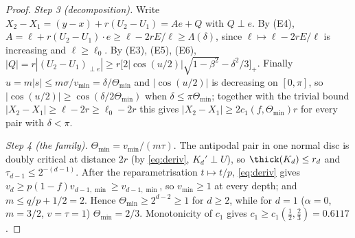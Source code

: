 \begin{proof}
\emph{Step 3 (decomposition).} Write $X_2-X_1=(y-x)+r(U_2-U_1)=Ae+Q$ with $Q\perp e$. By (E4),
$A=\ell+r(U_2-U_1)\cdot e\ge\ell-2rE/\ell\ge\Lambda(\delta)$, since $\ell\mapsto\ell-2rE/\ell$ is increasing and
$\ell\ge\ell_0$. By (E3), (E5), (E6), $|Q|=r|(U_2-U_1)_{\perp e}|\ge r\bigl[2|\cos(u/2)|\sqrt{1-\beta^2}-\delta^2/3\bigr]_+$.
Finally $u=m|s|\le m\sigma/v_{\min}=\delta/\Theta_{\min}$ and $|\cos(u/2)|$ is decreasing on $[0,\pi]$, so
$|\cos(u/2)|\ge\cos(\delta/2\Theta_{\min})$ when $\delta\le\pi\Theta_{\min}$; together with the trivial bound
$|X_2-X_1|\ge\ell-2r\ge\ell_0-2r$ this gives $|X_2-X_1|\ge2c_1(f,\Theta_{\min})r$ for every pair with $\delta<\pi$.

\emph{Step 4 (the family).} $\Theta_{\min}=v_{\min}/(m\tau)$. The antipodal pair in one normal disc is doubly critical
at distance $2r$ (by \eqref{eq:deriv}, $K_d'\perp U$), so $\thick(K_d)\le r_d$ and $\tau_{d-1}\le2^{-(d-1)}$.
After the reparametrisation $t\mapsto t/p$, \eqref{eq:deriv} gives $v_d\ge p(1-f)v_{d-1,\min}\ge v_{d-1,\min}$,
so $v_{\min}\ge1$ at every depth; and $m\le q/p+1/2=2$. Hence $\Theta_{\min}\ge2^{d-2}\ge1$ for $d\ge2$, while for
$d=1$ ($\alpha=0$, $m=3/2$, $v=\tau=1$) $\Theta_{\min}=2/3$. Monotonicity of $c_1$ gives
$c_1\ge c_1(\tfrac12,\tfrac23)=0.6117$.
\end{proof}

